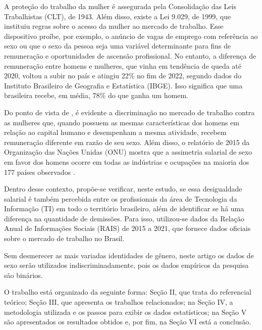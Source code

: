 A proteção do trabalho da mulher é assegurada pela Consolidação das Leis Trabalhistas (CLT), de 1943. Além disso, existe a Lei 9.029, de 1999, que instituiu regras sobre o acesso da mulher ao mercado de trabalho. Esse dispositivo proíbe, por exemplo, o anúncio de vagas de emprego com referência ao sexo ou que o sexo da pessoa seja uma variável determinante para fins de remuneração e oportunidades de ascensão profissional. No entanto, a diferença de remuneração entre homens e mulheres, que vinha em tendência de queda até 2020, voltou a subir no país e atingiu 22\% no fim de 2022, segundo dados do Instituto Brasileiro de Geografia e Estatística (IBGE). Isso significa que uma brasileira recebe, em média, 78\% do que ganha um homem.

Do ponto de vista de \cite{ahmed2015human}, é evidente a discriminação no mercado de trabalho contra as mulheres que, quando possuem as mesmas características dos homens em relação ao capital humano e desempenham a mesma atividade, recebem remuneração diferente em razão de seu sexo. Além disso, o relatório de 2015 da Organização das Nações Unidas (ONU) mostra que a assimetria salarial de sexo em favor dos homens ocorre em todas as indústrias e ocupações na maioria dos 177 países observados \cite{report2015onu}.

Dentro desse contexto, propõe-se verificar, neste estudo, se essa desigualdade salarial é também percebida entre os profissionais da área de Tecnologia da Informação (TI) em todo o território brasileiro, além de identificar se há uma diferença na quantidade de demissões. Para isso, utilizou-se dados da Relação Anual de Informações Sociais (RAIS) de 2015 a 2021, que fornece dados oficiais sobre o mercado de trabalho no Brasil. 

Sem desmerecer as mais variadas identidades de gênero, neste artigo os dados de sexo serão utilizados indiscriminadamente, pois os dados empíricos da pesquisa são binários.

O trabalho está organizado da seguinte forma: Seção II, que trata do referencial teórico; Seção III, que apresenta os trabalhos relacionados; na Seção IV, a metodologia utilizada e os passos para exibir os dados estatísticos; na Seção V são apresentados os resultados obtidos e, por fim, na Seção VI está a conclusão.